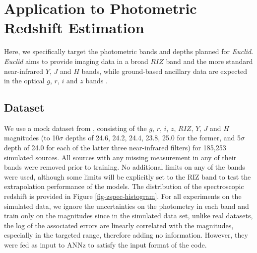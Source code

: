\documentclass[useAMS,usenatbib,fleqn]{mn2e}
\begin{document}
\section{Application to Photometric Redshift Estimation}
\label{sec-application}

Here, we specifically target the photometric bands and depths planned for {\em Euclid}. {\em Euclid} aims to provide imaging data in a broad $RIZ$ band and the more standard near-infrared $Y$, $J$ and $H$ bands, while ground-based ancillary data are expected in the optical $g$, $r$, $i$ and $z$ bands \citep{laureijs2011}. 


\subsection{Dataset}
\label{sec-dataset}

We use a mock dataset from \citet{jouvel09}, consisting of the $g$, $r$, $i$, $z$, $RIZ$, $Y$, $J$ and $H$ magnitudes (to 10$\sigma$ depths of 24.6, 24.2, 24.4, 23.8, 25.0 for the former, and 5$\sigma$ depth of 24.0 for each of the latter three near-infrared filters) for 185,253 simulated sources. All sources with any missing measurement in any of their bands were removed prior to training. No additional limits on any of the bands were used, although some limits will be explicitly set to the RIZ band to test the extrapolation performance of the models. The distribution of the spectroscopic redshift is provided in Figure \ref{fig-zspec-histogram}. For all experiments on the simulated data, we ignore the uncertainties on the photometry in each band and train only on the magnitudes since in the simulated data set, unlike real datasets, the log of the associated errors are linearly correlated with the magnitudes, especially in the targeted range, therefore adding no information. However, they were fed as input to {\sc ANNz} to satisfy the input format of the code.
\end{document}
